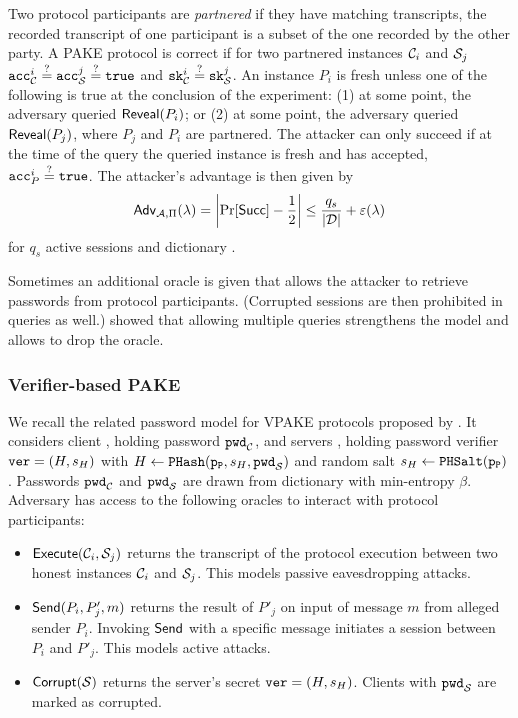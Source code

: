\noindent
Two protocol participants are \emph{partnered} if they have matching transcripts, \ie the recorded transcript of one participant is a subset of the one recorded by the other party.
A PAKE protocol is correct if for two partnered instances $\mathcal{C}_i$ and $\mathcal{S}_j$ $\mathtt{acc}_\mathcal{C}^i\stackrel{?}{=}\mathtt{acc}_\mathcal{S}^j\stackrel{?}{=}\mathtt{true}$ and $\mathtt{sk}_\mathcal{C}^i\stackrel{?}{=} \mathtt{sk}_\mathcal{S}^j$.
An instance $P_i$ is fresh unless one of the following is true at the conclusion of the experiment: (1) at some point, the adversary queried $\mathsf{Reveal}(P_i)$; or (2) at some point, the adversary queried $\mathsf{Reveal}(P_j)$, where $P_j$ and $P_i$ are partnered.
The attacker can only succeed if at the time of the \Test query the queried instance is fresh and has accepted, \ie $\mathtt{acc}_P^i\stackrel{?}{=}\mathtt{true}$.
The attacker's advantage is then given by
\[
  \mathsf{Adv}_{\mathcal{A},\Pi}(\lambda) = \left| \Pr[\mathsf{Succ}] - \frac12 \right| \leq \frac{q_s}{|\mathcal{D}|} + \varepsilon(\lambda)
\]
for $q_s$ active sessions and dictionary \cD.

Sometimes an additional \Corrupt oracle is given that allows the attacker to retrieve passwords from protocol participants.
(Corrupted sessions are then prohibited in \Test queries as well.)
\citet{Abdalla2005} showed that allowing multiple \Test queries strengthens the model and allows to drop the \Reveal oracle.


\subsubsection{Verifier-based PAKE} \label{sec:vpake-model}
We recall the related password model for \ac{VPAKE} protocols proposed by \citet{BenhamoudaP13}.
It considers client \Client, holding password $\mathtt{pwd}_\mathcal{C}$, and servers \Server, holding password verifier $\mathtt{ver}=(H,s_H)$ with $H\gets\mathtt{PHash}(\mathtt{p_P}, s_H, \mathtt{pwd}_\mathcal{S})$ and random salt $s_H\gets\mathtt{PHSalt}(\mathtt{p_P})$.
Passwords $\mathtt{pwd}_\mathcal{C}$ and $\mathtt{pwd}_\mathcal{S}$ are drawn from dictionary \cD with min-entropy $\beta$.
Adversary \cA has access to the following oracles to interact with protocol participants:

\begin{itemize}
	\item $\mathsf{Execute}(\mathcal{C}_i,\mathcal{S}_j)$ returns the transcript of the protocol execution between two honest instances $\mathcal{C}_i$ and $\mathcal{S}_j$.
		This models passive eavesdropping attacks.
	
	\item $\mathsf{Send}(P_i, P'_j, m)$ returns the result of $P'_j$ on input of message $m$ from alleged sender $P_i$.
		Invoking $\mathsf{Send}$ with a specific message initiates a session between $P_i$ and $P'_j$.
		This models active attacks.
		
	\item $\mathsf{Corrupt}(\mathcal{S})$ returns the server's secret $\mathtt{ver}=(H,s_H)$.
		Clients with $\mathtt{pwd}_\mathcal{S}$ are marked as corrupted.
\end{itemize}

